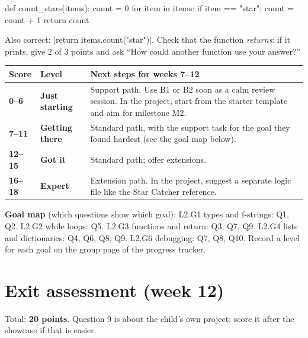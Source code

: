 \begin{answer}
\begin{pycode}
def count_stars(items):
    count = 0
    for item in items:
        if item == "star":
            count = count + 1
    return count
\end{pycode}
Also correct: \py|return items.count("star")|. Check that the function \emph{returns}: if it
prints, give 2 of 3 points and ask \enquote{How could another function use your answer?}
\end{answer}

\begin{rubric}
\renewcommand{\arraystretch}{1.3}
\begin{tabularx}{\linewidth}{@{}>{\bfseries}p{1.6cm}>{\bfseries}p{2.4cm}X@{}}
\toprule
Score & Level & Next steps for weeks 7--12 \\ \midrule
0--6 & Just starting & Support path. Use B1 or B2 soon as a calm review session. In the project, start from the starter template and aim for milestone M2. \\
7--11 & Getting there & Standard path, with the support task for the goal they found hardest (see the goal map below). \\
12--15 & Got it & Standard path; offer extensions. \\
16--18 & Expert & Extension path. In the project, suggest a separate logic file like the Star Catcher reference. \\
\bottomrule
\end{tabularx}
\end{rubric}

\textbf{Goal map} (which questions show which goal): L2.G1 types and f-strings: Q1, Q2.
L2.G2 while loops: Q5. L2.G3 functions and return: Q3, Q7, Q9. L2.G4 lists and dictionaries:
Q4, Q6, Q8, Q9. L2.G6 debugging: Q7, Q8, Q10. Record a level for each goal on the group page
of the progress tracker.

\clearpage
\section{Exit assessment (week 12)}
Total: \textbf{20 points}. Question 9 is about the child's own project: score it after the showcase
if that is easier.

